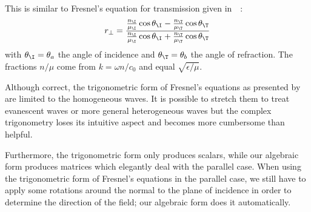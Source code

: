 This is similar to Fresnel's equation for transmission given
in~~\cite{hecht2002optics}:
\begin{equation}
    r_\perp
    =
    \frac{
        \frac{n_\I}{\mu_\I} \cos \theta_\I
        -
        \frac{n_\T}{\mu_\T} \cos \theta_\T
    }{
        \frac{n_\I}{\mu_\I} \cos \theta_\I
        +
        \frac{n_\T}{\mu_\T} \cos \theta_\T
    }
\end{equation}
with $\theta_\I=\theta_a$ the angle of incidence and $\theta_\T=\theta_b$ the angle of refraction.
The fractions $n/\mu$ come from $k=\omega n/c_0$ and equal $\sqrt{\epsilon/\mu}$.

Although correct, the trigonometric form of Fresnel's equations as presented by~\citeauthor{hecht2002optics} are limited to the homogeneous waves.
It is possible to stretch them to treat evanescent waves or more general heterogeneous waves but the complex trigonometry loses its intuitive aspect and becomes more cumbersome than helpful.

Furthermore, the trigonometric form only produces scalars, while our algebraic form produces matrices which elegantly deal with the parallel case.
When using the trigonometric form of Fresnel's equations in the parallel case, we still have to apply some rotations around the normal to the plane of incidence in order to determine the direction of the field;
our algebraic form does it automatically.

